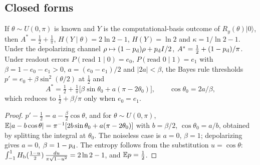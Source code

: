 \subsection{Closed forms}
\begin{proposition}[Qubit]\label{prop:appqubit}
If $\theta\sim U(0,\pi)$ is known and $Y$ is the computational-basis outcome of $R_y(\theta)\lvert0\rangle$, then $A^*=\tfrac12+\tfrac1\pi$, $H(Y\mid\theta)=2\ln2-1$, $H(Y)=\ln2$ and $\kappa=1/\ln2-1$. Under the depolarizing channel $\rho\mapsto(1-p_{\rm d})\rho+p_{\rm d}I/2$, $A^*=\tfrac12+(1-p_{\rm d})/\pi$. Under readout errors $P(\text{read }1\mid0)=e_0$, $P(\text{read }0\mid1)=e_1$ with $\beta=1-e_0-e_1>0$, $a=(e_0-e_1)/2$ and $|2a|<\beta$, the Bayes rule thresholds $p'=e_0+\beta\sin^2(\theta/2)$ at $\tfrac12$ and
\begin{equation*}
A^*=\tfrac12+\tfrac1\pi\big[\beta\sin\theta_0+a(\pi-2\theta_0)\big],\qquad \cos\theta_0=2a/\beta,
\end{equation*}
which reduces to $\tfrac12+\beta/\pi$ only when $e_0=e_1$.
\end{proposition}
\begin{proof}
$p'-\tfrac12=a-\tfrac\beta2\cos\theta$, and for $\theta\sim U(0,\pi)$, $\mathbb{E}|a-b\cos\theta|=\pi^{-1}[2b\sin\theta_0+a(\pi-2\theta_0)]$ with $b=\beta/2$, $\cos\theta_0=a/b$, obtained by splitting the integral at $\theta_0$. The noiseless case is $a=0$, $\beta=1$; depolarizing gives $a=0$, $\beta=1-p_{\rm d}$. The entropy follows from the substitution $u=\cos\theta$: $\int_{-1}^1H_{\mathrm b}(\tfrac{1-u}2)\,\frac{du}{\pi\sqrt{1-u^2}}=2\ln2-1$, and $\mathbb{E} p=\tfrac12$.
\end{proof}

